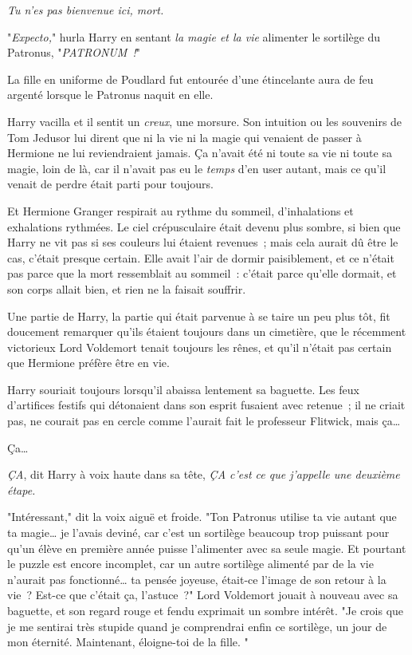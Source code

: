 \emph{Tu n'es pas bienvenue ici, mort.}

"\emph{Expecto,}" hurla Harry en sentant \emph{la magie et la vie} alimenter le sortilège du Patronus, "\emph{PATRONUM~!}"

La fille en uniforme de Poudlard fut entourée d'une étincelante aura de feu argenté lorsque le Patronus naquit en elle.

Harry vacilla et il sentit un \emph{creux}, une morsure. Son intuition ou les souvenirs de Tom Jedusor lui dirent que ni la vie ni la magie qui venaient de passer à Hermione ne lui reviendraient jamais. Ça n'avait été ni toute sa vie ni toute sa magie, loin de là, car il n'avait pas eu le \emph{temps} d'en user autant, mais ce qu'il venait de perdre était parti pour toujours.

Et Hermione Granger respirait au rythme du sommeil, d'inhalations et exhalations rythmées. Le ciel crépusculaire était devenu plus sombre, si bien que Harry ne vit pas si ses couleurs lui étaient revenues~; mais cela aurait dû être le cas, c'était presque certain. Elle avait l'air de dormir paisiblement, et ce n'était pas parce que la mort ressemblait au sommeil~: c'était parce qu'elle dormait, et son corps allait bien, et rien ne la faisait souffrir.

Une partie de Harry, la partie qui était parvenue à se taire un peu plus tôt, fit doucement remarquer qu'ils étaient toujours dans un cimetière, que le récemment victorieux Lord Voldemort tenait toujours les rênes, et qu'il n'était pas certain que Hermione préfère être en vie.

Harry souriait toujours lorsqu'il abaissa lentement sa baguette. Les feux d'artifices festifs qui détonaient dans son esprit fusaient avec retenue~; il ne criait pas, ne courait pas en cercle comme l'aurait fait le professeur Flitwick, mais ça…

Ça…

\emph{ÇA}, dit Harry à voix haute dans sa tête, \emph{ÇA c'est ce que j'appelle une deuxième étape.}

"Intéressant," dit la voix aiguë et froide. "Ton Patronus utilise ta vie autant que ta magie… je l'avais deviné, car c'est un sortilège beaucoup trop puissant pour qu'un élève en première année puisse l'alimenter avec sa seule magie. Et pourtant le puzzle est encore incomplet, car un autre sortilège alimenté par de la vie n'aurait pas fonctionné… ta pensée joyeuse, était-ce l'image de son retour à la vie~? Est-ce que c'était ça, l'astuce~?" Lord Voldemort jouait à nouveau avec sa baguette, et son regard rouge et fendu exprimait un sombre intérêt. "Je crois que je me sentirai très stupide quand je comprendrai enfin ce sortilège, un jour de mon éternité. Maintenant, éloigne-toi de la fille. "

